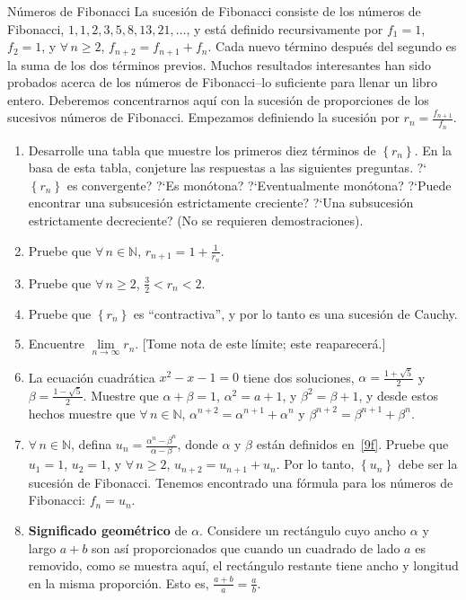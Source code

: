 \begin{solution}
	
\end{solution}

\begin{prob}{Números de Fibonacci}
	La sucesión de Fibonacci consiste de los números de Fibonacci, $1,1,2,3,5,8,13,21,\ldots$, y está definido recursivamente por $f_{1}=1$, $f_{2}=1$, y $\forall\,n\geq2$, $f_{n+2}=f_{n+1}+f_{n}$. Cada nuevo término después del segundo es la suma de los dos términos previos. Muchos resultados interesantes han sido probados acerca de los números de Fibonacci--lo suficiente para llenar un libro entero. Deberemos concentrarnos aquí con la sucesión de proporciones de los sucesivos números de Fibonacci. Empezamos definiendo la sucesión por $r_{n}=\tfrac{f_{n+1}}{f_{n}}$.
		\begin{enumerate}
			\item Desarrolle una tabla que muestre los primeros diez términos de $\left\{r_{n}\right\}$. En la basa de esta tabla, conjeture las respuestas a las siguientes preguntas. ?`$\left\{r_{n}\right\}$ es convergente? ?`Es monótona? ?`Eventualmente monótona? ?`Puede encontrar una subsucesión estrictamente creciente? ?`Una subsucesión estrictamente decreciente? (No se requieren demostraciones).
			\item Pruebe que $\forall\,n\in\mathds{N}$, $r_{n+1}=1+\tfrac{1}{r_{n}}$.
			\item Pruebe que $\forall\,n\geq2$, $\tfrac{3}{2}<r_{n}<2$.
			\item Pruebe que $\left\{r_{n}\right\}$ es ``contractiva'', y por lo tanto es una sucesión de Cauchy.
			\item Encuentre $\lim\limits_{n\to\infty}r_{n}$. [Tome nota de este límite; este reaparecerá.]
			\item La ecuación cuadrática $x^{2}-x-1=0$ tiene dos soluciones, $\alpha=\frac{1+\sqrt{5}}{2}$ y $\beta=\frac{1-\sqrt{5}}{2}$. Muestre que $\alpha+\beta=1$, $\alpha^{2}=a+1$, y $\beta^{2}=\beta+1$, y desde estos hechos muestre que $\forall\,n\in\mathbb{N}$, $\alpha^{n+2}=\alpha^{n+1}+\alpha^{n}$ y $\beta^{n+2}=\beta^{n+1}+\beta^{n}$.\label{9f}
			\item $\forall\,n\in\mathds{N}$, defina $u_{n}=\frac{\alpha^{n}-\beta^{n}}{\alpha-\beta}$, donde $\alpha$ y $\beta$ están definidos en~\ref{9f}. Pruebe que $u_{1}=1$, $u_{2}=1$, y $\forall\,n\geq2$, $u_{n+2}=u_{n+1}+u_{n}$. Por lo tanto, $\left\{u_{n}\right\}$ debe ser la sucesión de Fibonacci. Tenemos encontrado una fórmula para los números de Fibonacci: $f_{n}=u_{n}$.
			\item \textbf{Significado geométrico} de $\alpha$. Considere un rectángulo cuyo ancho $\alpha$ y largo $a+b$ son así proporcionados que cuando un cuadrado de lado $a$ es removido, como se muestra aquí, el rectángulo restante tiene ancho y longitud en la misma proporción. Esto es, $\tfrac{a+b}{a}=\tfrac{a}{b}$.
	

\end{enumerate}
\end{prob}

